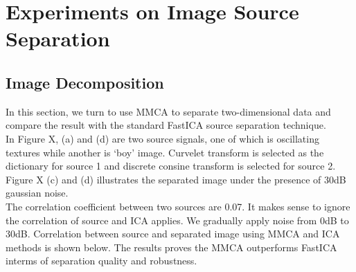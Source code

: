 \section{Experiments on Image Source Separation}

\subsection{Image Decomposition}

In this section, we turn to use MMCA to separate two-dimensional data and compare the result with the standard FastICA source separation technique. \\

In Figure X, (a) and (d) are two source signals, one of which is oscillating textures while another is `boy' image. Curvelet transform is selected as the dictionary for source 1 and discrete consine transform is selected for source 2. Figure X (c) and (d) illustrates the separated image under the presence of 30dB gaussian noise.\\

The correlation coefficient between two sources are 0.07. It makes sense to ignore the correlation of source and ICA applies. We gradually apply noise from 0dB to 30dB. Correlation between source and separated image using MMCA and ICA methods is shown below.
The results proves the MMCA outperforms FastICA interms of separation quality and robustness.

